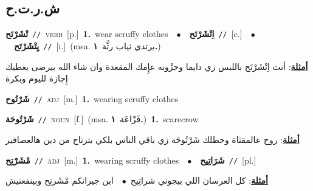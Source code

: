 \documentclass[10pt,a4paper,twoside]{article} %
\begin{document}
\begin{multicols}{2}
\vspace{-3mm}
\subsection*{\color{blue}\foreignlanguage{arabic}{ش.ر.ت.ح}\color{blue}{}} 

{\setlength\topsep{0pt}\textbf{\foreignlanguage{arabic}{تْشَرْتَح}}\ {\color{gray}\texttt{//}\color{black}}\ \textsc{verb}\ [p.]\ \textbf{1.}~wear scruffy clothes\ \ $\bullet$\ \ \setlength\topsep{0pt}\textbf{\foreignlanguage{arabic}{اِتْشَرْتَح}}\ {\color{gray}\texttt{//}\color{black}}\ [c.]\ \ $\bullet$\ \ \setlength\topsep{0pt}\textbf{\foreignlanguage{arabic}{يِتْشَرْتَح}}\ {\color{gray}\texttt{//}\color{black}}\ [i.]\ \color{gray}(msa. \foreignlanguage{arabic}{يرتدي ثياب رثَّة}~\foreignlanguage{arabic}{\textbf{١.}})\color{black}\  \begin{flushright}\color{gray}\foreignlanguage{arabic}{\textbf{\underline{\foreignlanguage{arabic}{أمثلة}}}: أنت اِتْشَرْتَح باللبس زي دايما وحزْونه عإِمك المقعدة وان شاء الله بيرضى يعطيك إِجازة لليوم وبكرة}\end{flushright}\color{black}} \vspace{2mm}

{\setlength\topsep{0pt}\textbf{\foreignlanguage{arabic}{شَرْتُوح}}\ {\color{gray}\texttt{//}\color{black}}\ \textsc{adj}\ [m.]\ \textbf{1.}~wearing scruffy clothes\ } \vspace{2mm}

{\setlength\topsep{0pt}\textbf{\foreignlanguage{arabic}{شَرْتُوحَة}}\ {\color{gray}\texttt{//}\color{black}}\ \textsc{noun}\ [f.]\ \color{gray}(msa. \foreignlanguage{arabic}{فَزّاعَة}~\foreignlanguage{arabic}{\textbf{١.}})\color{black}\ \textbf{1.}~scarecrow\  \begin{flushright}\color{gray}\foreignlanguage{arabic}{\textbf{\underline{\foreignlanguage{arabic}{أمثلة}}}: روح عالمقثاة وحطلك شَرْتُوحَة زي باقي الناس بلكي بترتاح من دين هالعصافير}\end{flushright}\color{black}} \vspace{2mm}

{\setlength\topsep{0pt}\textbf{\foreignlanguage{arabic}{مْشَرْتِح}}\ {\color{gray}\texttt{//}\color{black}}\ \textsc{adj}\ [m.]\ \textbf{1.}~wearing scruffy clothes\ \ $\bullet$\ \ \setlength\topsep{0pt}\textbf{\foreignlanguage{arabic}{شَرَاتِيح}}\ {\color{gray}\texttt{//}\color{black}}\ [pl.]\  \begin{flushright}\color{gray}\foreignlanguage{arabic}{\textbf{\underline{\foreignlanguage{arabic}{أمثلة}}}: كل العرسان اللي بيجوني شراتِيح\ $\bullet$\ \  ابن جيرانكم مْشَرتِح وبينفعنيش}\end{flushright}\color{black}} \vspace{2mm}


\end{multicols}
\end{document}

